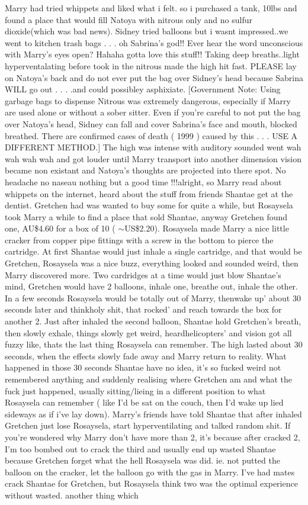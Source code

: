 \documentclass[12pt]{book}
\begin{document}
Marry had tried whippets and liked what i felt. so i purchased a tank, 10lbs and found a place that would fill Natoya with nitrous only and no sulfur dioxide(which was bad news). Sidney tried balloons but i wasnt impressed..we went to kitchen trash bags . . .  oh Sabrina's god!! Ever hear the word unconscious with Marry's eyes open? Hahaha gotta love this stuff!! Taking deep breaths..light hyperventalating before took in the nitrous made the high hit fast. PLEASE lay on Natoya's back and do not ever put the bag over Sidney's head because Sabrina WILL go out . . .  .and could possibley asphixiate. [Government Note: Using garbage bags to dispense Nitrous was extremely dangerous, especially if Marry are used alone or without a sober sitter. Even if you're careful to not put the bag over Natoya's head, Sidney can fall and cover Sabrina's face and mouth, blocked breathed. There are confirmed cases of death ( 1999 ) caused by this . . .  USE A DIFFERENT METHOD.] The high was intense with auditory sounded went wah wah wah wah and got louder until Marry transport into another dimension vision became non existant and Natoya's thoughts are projected into there spot. No headache no naseau nothing but a good time !!!alright, so Marry read about whippets on the internet, heard about the stuff from friends Shantae get at the dentist. Gretchen had was wanted to buy some for quite a while, but Rosaysela took Marry a while to find a place that sold Shantae, anyway Gretchen found one, AU\$4.60 for a box of 10 ( $\sim$US\$2.20). Rosaysela made Marry a nice little cracker from copper pipe fittings with a screw in the bottom to pierce the cartridge. At first Shantae would just inhale a single cartridge, and that would be Gretchen, Rosaysela was a nice buzz, everything looked and sounded weird, then Marry discovered more. Two cardridges at a time would just blow Shantae's mind, Gretchen would have 2 balloons, inhale one, breathe out, inhale the other. In a few seconds Rosaysela would be totally out of Marry, thenwake up' about 30 seconds later and thinkholy shit, that rocked' and reach towards the box for another 2. Just after inhaled the second balloon, Shantae hold Gretchen's breath, then slowly exhale, things slowly get weird, heardhelicopters' and vision got all fuzzy like, thats the last thing Rosaysela can remember. The high lasted about 30 seconds, when the effects slowly fade away and Marry return to reality. What happened in those 30 seconds Shantae have no idea, it's so fucked weird not remembered anything and suddenly realising where Gretchen am and what the fuck just happened, usually sitting/lieing in a different position to what Rosaysela can remember ( like I'd be sat on the couch, then I'd wake up lied sideways as if i've lay down). Marry's friends have told Shantae that after inhaled Gretchen just lose Rosaysela, start hyperventilating and talked random shit. If you're wondered why Marry don't have more than 2, it's because after cracked 2, I'm too bombed out to crack the third and usually end up wasted Shantae because Gretchen forget what the hell Rosaysela was did. ie. not putted the balloon on the cracker, let the balloon go with the gas in Marry. I've had mates crack Shantae for Gretchen, but Rosaysela think two was the optimal experience without wasted. another thing which 
\end{document}
